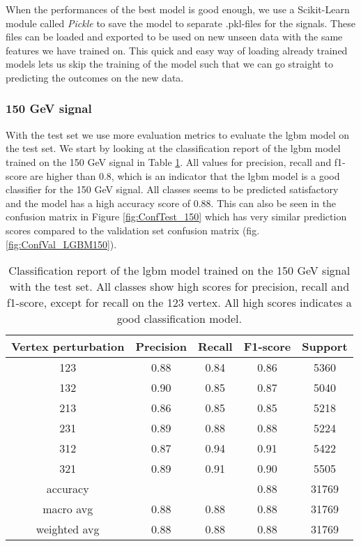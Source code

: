 \documentclass[a4paper, american, 12pt]{report}
\begin{document}
	When the performances of the best model is good enough, we use a Scikit-Learn module called \textit{Pickle} to save the model to separate .pkl-files for the signals. These files can be loaded and exported to be used on new unseen data with the same features we have trained on. This quick and easy way of loading already trained models lets us skip the training of the model such that we can go straight to predicting the outcomes on the new data.
	
	
	\subsubsection{150 GeV signal}
	\label{subsect:Result-Test150}
	With the test set we use more evaluation metrics to evaluate the \acrshort{lgbm} model on the test set. We start by looking at the classification report of the \acrshort{lgbm} model trained on the 150 GeV signal in Table \ref{tab:ClassReport_150}. All values for precision, recall and f1-score are higher than 0.8, which is an indicator that the \acrshort{lgbm} model is a good classifier for the 150 GeV signal. All classes seems to be predicted satisfactory and the model has a high accuracy score of 0.88. This can also be seen in the confusion matrix in Figure \ref{fig:ConfTest_150} which has very similar prediction scores compared to the validation set confusion matrix (fig. \ref{fig:ConfVal_LGBM150}).
	\begin{table}[htb!]
		\centering
		\begin{tabular}{ |c|c|c|c|c| }
			\hline \rule{0pt}{13pt}
			Vertex perturbation & Precision & Recall & F1-score & Support \\
			\hline \rule{0pt}{13pt}
			123 & 0.88 & 0.84 & 0.86 & 5360 \\
			\hline \rule{0pt}{13pt}
			132 & 0.90 & 0.85 & 0.87 & 5040 \\
			\hline \rule{0pt}{13pt}
			213 & 0.86 & 0.85 & 0.85 & 5218 \\
			\hline \rule{0pt}{13pt}
			231 & 0.89 & 0.88 & 0.88 & 5224  \\
			\hline \rule{0pt}{13pt}
			312 & 0.87 & 0.94 & 0.91 & 5422 \\
			\hline \rule{0pt}{13pt}
			321 & 0.89 & 0.91 & 0.90 & 5505 \\
			\hline \rule{0pt}{13pt}
			accuracy &   &   &  0.88 & 31769 \\
			\hline \rule{0pt}{13pt}
			macro avg & 0.88 & 0.88 & 0.88 & 31769 \\
			\hline \rule{0pt}{13pt}
			weighted avg & 0.88 & 0.88 & 0.88 & 31769 \\
			\hline
		\end{tabular}	         
		\caption[Classification report of the \acrshort{lgbm} model trained on the 150 GeV signal.]{Classification report of the \acrshort{lgbm} model trained on the 150 GeV signal with the test set. All classes show high scores for precision, recall and f1-score, except for recall on the 123 vertex. All high scores indicates a good classification model.}
		\label{tab:ClassReport_150}
	\end{table} 
\end{document}
